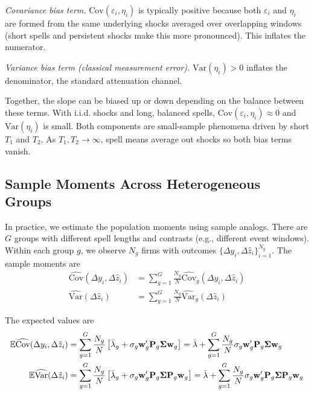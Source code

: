 \documentclass[11pt,a4paper]{article}
\newcommand{\Var}{\text{Var}}
\newcommand{\Cov}{\text{Cov}}
\begin{document}
\textit{Covariance bias term.} $\Cov(\varepsilon_i,\eta_i)$ is typically positive because both $\varepsilon_i$ and $\eta_i$ are formed from the same underlying shocks averaged over overlapping windows (short spells and persistent shocks make this more pronounced). This inflates the numerator.

\textit{Variance bias term (classical measurement error).} $\Var(\eta_i)>0$ inflates the denominator, the standard attenuation channel.

Together, the slope can be biased up or down depending on the balance between these terms. With i.i.d. shocks and long, balanced spells, $\Cov(\varepsilon_i,\eta_i)\approx 0$ and $\Var(\eta_i)$ is small. Both components are small-sample phenomena driven by short $T_1$ and $T_2$. As $T_1,T_2\to\infty$, spell means average out shocks so both bias terms vanish. 

\subsection{Sample Moments Across Heterogeneous Groups}

In practice, we estimate the population moments using sample analogs. There are $G$ groups with different spell lengths and contrasts (e.g., different event windows). Within each group $g$, we observe $N_g$ firms with outcomes $\{\Delta y_i, \Delta \hat z_i\}_{i=1}^{N_g}$. The sample moments are
\begin{align}
\widehat{\Cov}(\Delta y_i,\Delta \hat z_i) &= \sum_{g=1}^G \frac{N_g}{N} \widehat{\Cov}_g(\Delta y_i,\Delta \hat z_i)\\
\widehat{\Var}(\Delta \hat z_i) &= \sum_{g=1}^G \frac{N_g}{N} \widehat{\Var}_g(\Delta \hat z_i)
\end{align}

The expected values are
\begin{align}
\mathbb E\widehat{\Cov}(\Delta y_i,\Delta \hat z_i) &= \sum_{g=1}^G \frac{N_g}{N} \left[ 
\Bar\lambda_g
+ \sigma_g \mathbf w_g' \mathbf P_g\mathbf\Sigma \mathbf w_g\right] = 
\Bar\lambda +\sum_{g=1}^G \frac{N_g}{N} \sigma_g \mathbf w_g' \mathbf P_g\mathbf\Sigma \mathbf w_g\\
\mathbb E\widehat{\Var}(\Delta \hat z_i) &= \sum_{g=1}^G \frac{N_g}{N} \left[ 
\Bar\lambda_g
+ \sigma_g \mathbf w_g' \mathbf P_g\mathbf\Sigma \mathbf P_g \mathbf w_g\right] = 
\Bar\lambda +\sum_{g=1}^G \frac{N_g}{N} \sigma_g \mathbf w_g' \mathbf P_g\mathbf\Sigma \mathbf P_g \mathbf w_g
\end{align}
\end{document}
